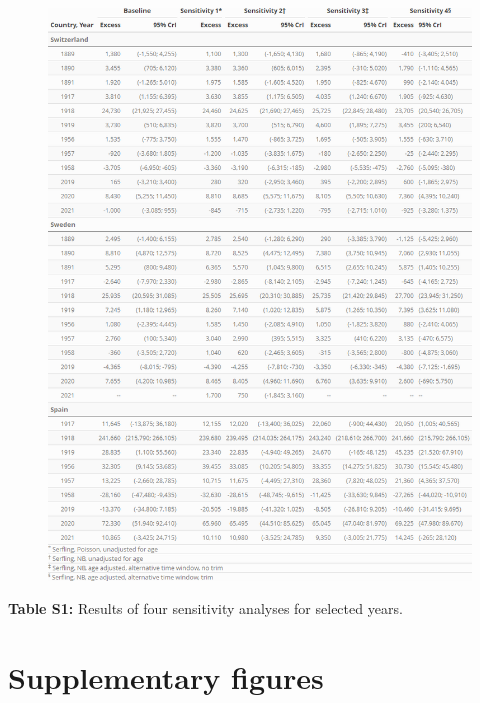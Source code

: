 \documentclass{article}
\begin{document}
	\begin{figure}[H]
		\centering	
		\includegraphics[width=\linewidth]{../Table_S1.png}
	\end{figure}
	
	\textbf{Table S1:} Results of four sensitivity analyses for selected years.  
	
	\section{Supplementary figures}
	
\end{document}
